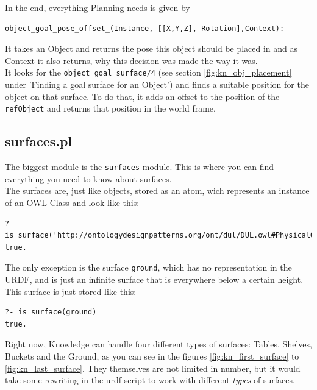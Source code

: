 \documentclass[main.tex]{subfiles}
\begin{document}
In the end, everything Planning needs is given by
\begin{lstlisting}
object_goal_pose_offset_(Instance, [[X,Y,Z], Rotation],Context):-
\end{lstlisting}
It takes an Object and returns the pose this object should be placed in and as Context it also returns, why this decision was made the way it was.\\
It looks for the \texttt{object\_goal\_surface/4} (see section \ref{fig:kn_obj_placement} under 'Finding a goal surface for an Object') and finds a suitable position for the object on that surface. To do that, it adds an offset to the position of the \texttt{refObject} and returns that position in the world frame.

\subsection{surfaces.pl}

The biggest module is the \texttt{surfaces} module. This is where you can find everything you need to know about surfaces.\\
The surfaces are, just like objects, stored as an atom, wich represents an instance of an OWL-Class and look like this:
\begin{lstlisting}
?- is_surface('http://ontologydesignpatterns.org/ont/dul/DUL.owl#PhysicalObject_UHOJSVEC')
true.
\end{lstlisting}
The only exception is the surface \texttt{ground}, which has no representation in the URDF, and is just an infinite surface that is everywhere below a certain height. This surface is just stored like this:
\begin{lstlisting}
?- is_surface(ground)
true.
\end{lstlisting}

Right now, Knowledge can handle four different types of surfaces: Tables, Shelves, Buckets and the Ground, as you can see in the figures \ref{fig:kn_first_surface} to \ref{fig:kn_last_surface}. They themselves are not limited in number, but it would take some rewriting in the urdf script to work with different \textit{types} of surfaces.
\end{document}
